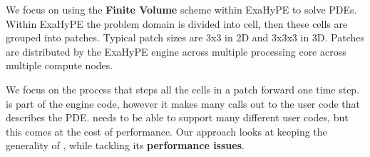 We focus on using the \textbf{Finite Volume} scheme within ExaHyPE to solve PDEs.
Within ExaHyPE the problem domain is divided into cell, then these cells are grouped into patches.
Typical patch sizes are 3x3 in 2D and 3x3x3 in 3D.
Patches are distributed by the ExaHyPE engine across multiple processing core across multiple compute nodes.

We focus on the  process that steps all the cells in a patch forward one time step.
 is part of the engine code, however it makes many calls out to the user code that describes the PDE.
 needs to be able to support many different user codes, but this comes at the cost of performance.
Our approach looks at keeping the generality of , while tackling its \textbf{performance issues}.  